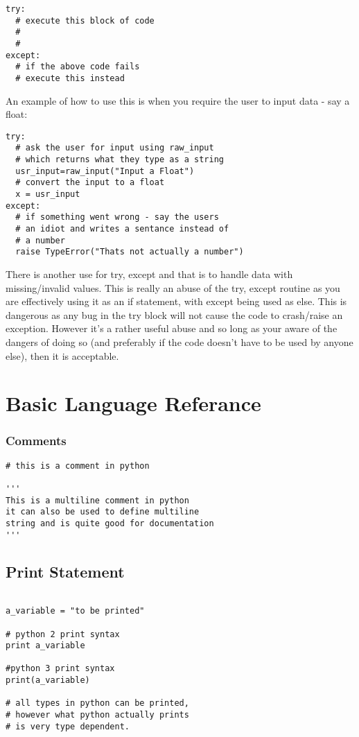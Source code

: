 \documentclass[11pt,a4paper]{article}
\begin{document}
\begin{verbatim}
try:
  # execute this block of code
  #
  #
except:
  # if the above code fails
  # execute this instead
\end{verbatim}

An example of how to use this is when you require the user to input data - say a float:

\begin{verbatim}
try:
  # ask the user for input using raw_input
  # which returns what they type as a string
  usr_input=raw_input("Input a Float")
  # convert the input to a float
  x = usr_input
except:
  # if something went wrong - say the users
  # an idiot and writes a sentance instead of
  # a number
  raise TypeError("Thats not actually a number")
\end{verbatim}

There is another use for try, except and that is to handle data with missing/invalid values. This is really an abuse of the try, except routine as you are effectively using it as an if statement, with except being used as else. This is dangerous as any bug in the try block will not cause the code to crash/raise an exception. However it's a rather useful abuse and so long as your aware of the dangers of doing so (and preferably if the code doesn't have to be used by anyone else), then it is acceptable.

\appendix

\section{Basic Language Referance}

\subsubsection{Comments}
\begin{verbatim}
# this is a comment in python

'''
This is a multiline comment in python
it can also be used to define multiline
string and is quite good for documentation
'''

\end{verbatim}

\subsection{Print Statement}
\begin{verbatim}

a_variable = "to be printed"

# python 2 print syntax
print a_variable

#python 3 print syntax
print(a_variable)

# all types in python can be printed,
# however what python actually prints
# is very type dependent.

\end{verbatim}
\end{document}
